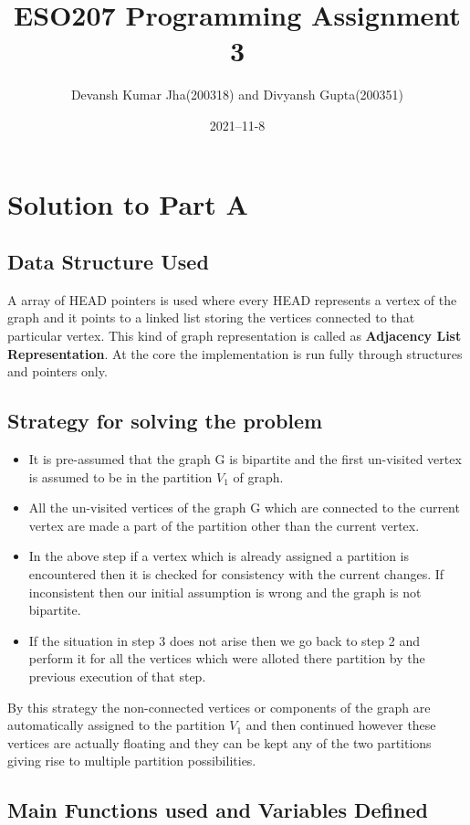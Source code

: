 \documentclass[20pt]{article}
\title{ESO207 Programming Assignment 3}
\author{Devansh Kumar Jha(200318) and Divyansh Gupta(200351)}
\date{2021–11-8}
\begin{document}
\maketitle

\section{Solution to Part A}
\subsection{Data Structure Used}
A array of HEAD pointers is used where every HEAD represents a vertex of the graph and it points to a linked list storing the vertices connected to that particular vertex. This kind of graph representation is called as \textbf{Adjacency List Representation}. At the core the implementation is run fully through structures and pointers only.

\subsection{Strategy for solving the problem}

\begin{itemize}
\item It is pre-assumed that the graph G is bipartite and the first un-visited vertex is assumed to be in the partition $V_1$ of graph.
\item All the un-visited vertices of the graph G which are connected to the current vertex are made a part of the partition other than the current vertex.
\item In the above step if a vertex which is already assigned a partition is encountered then it is checked for consistency with the current changes. If inconsistent then our initial assumption is wrong and the graph is not bipartite.
\item If the situation in step 3 does not arise then we go back to step 2 and perform it for all the vertices which were alloted there partition by the previous execution of that step.
\end{itemize}

By this strategy the non-connected vertices or components of the graph are automatically assigned to the partition $V_1$ and then continued however these vertices are actually floating and they can be kept any of the two partitions giving rise to multiple partition possibilities.

\subsection{Main Functions used and Variables Defined}
\end{document}
